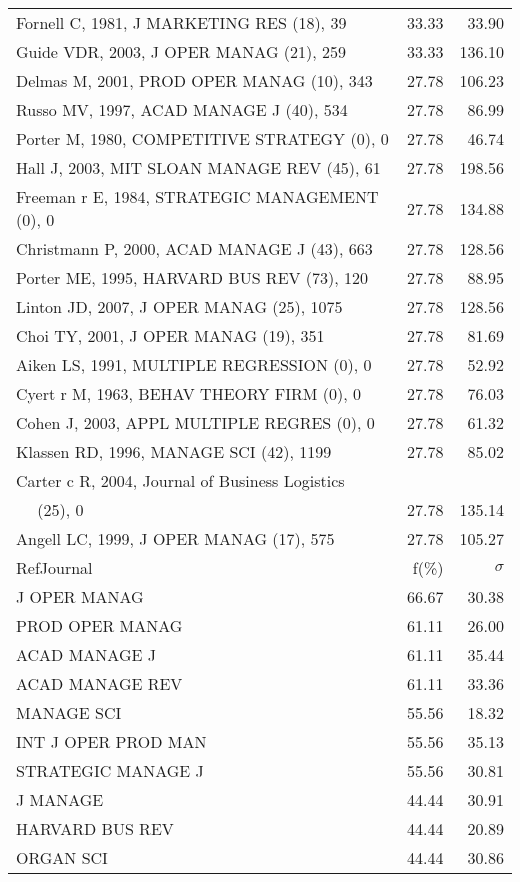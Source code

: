 \documentclass[a4paper,11pt]{report}
\begin{document}
\begin{landscape}
\begin{table}[!ht]
{\begin{tabular}{|l r r|}
Fornell C, 1981, J MARKETING RES (18), 39 & 33.33 & 33.90\\
Guide VDR, 2003, J OPER MANAG (21), 259 & 33.33 & 136.10\\
Delmas M, 2001, PROD OPER MANAG (10), 343 & 27.78 & 106.23\\
Russo MV, 1997, ACAD MANAGE J (40), 534 & 27.78 & 86.99\\
Porter M, 1980, COMPETITIVE STRATEGY (0), 0 & 27.78 & 46.74\\
Hall J, 2003, MIT SLOAN MANAGE REV (45), 61 & 27.78 & 198.56\\
Freeman r E, 1984, STRATEGIC MANAGEMENT (0), 0 & 27.78 & 134.88\\
Christmann P, 2000, ACAD MANAGE J (43), 663 & 27.78 & 128.56\\
Porter ME, 1995, HARVARD BUS REV (73), 120 & 27.78 & 88.95\\
Linton JD, 2007, J OPER MANAG (25), 1075 & 27.78 & 128.56\\
Choi TY, 2001, J OPER MANAG (19), 351 & 27.78 & 81.69\\
Aiken LS, 1991, MULTIPLE REGRESSION (0), 0 & 27.78 & 52.92\\
Cyert r M, 1963, BEHAV THEORY FIRM (0), 0 & 27.78 & 76.03\\
Cohen J, 2003, APPL MULTIPLE REGRES (0), 0 & 27.78 & 61.32\\
Klassen RD, 1996, MANAGE SCI (42), 1199 & 27.78 & 85.02\\
Carter c R, 2004, Journal of Business Logistics &  & \\
$\quad$ (25), 0 & 27.78 & 135.14\\
Angell LC, 1999, J OPER MANAG (17), 575 & 27.78 & 105.27\\
\hline
\hline
RefJournal & f(\%) & $\sigma$\\
\hline
J OPER MANAG & 66.67 & 30.38\\
PROD OPER MANAG & 61.11 & 26.00\\
ACAD MANAGE J & 61.11 & 35.44\\
ACAD MANAGE REV & 61.11 & 33.36\\
MANAGE SCI & 55.56 & 18.32\\
INT J OPER PROD MAN & 55.56 & 35.13\\
STRATEGIC MANAGE J & 55.56 & 30.81\\
J MANAGE & 44.44 & 30.91\\
HARVARD BUS REV & 44.44 & 20.89\\
ORGAN SCI & 44.44 & 30.86\\
\hline
\end{tabular}
}
\end{table}

\end{landscape}
\end{document}
